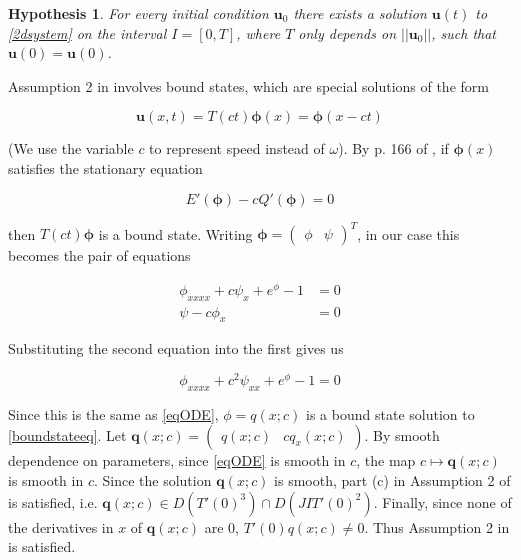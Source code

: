 \documentclass[12pt]{article}
\newtheorem{hypothesis}{Hypothesis}
\begin{document}
\begin{hypothesis}
For every initial condition $\textbf{u}_0$ there exists a solution $\textbf{u}(t)$ to \eqref{2dsystem} on the interval $I = [0, T]$, where $T$ only depends on $||\textbf{u}_0||$, such that $\textbf{u}(0) = \textbf{u}(0)$. 
\end{hypothesis}

Assumption 2 in \cite{Grillakis1987} involves bound states, which are special solutions of the form

\begin{equation}\label{boundstate}
\textbf{u}(x, t) = T(ct)\boldsymbol\phi(x) = \boldsymbol\phi(x - ct)
\end{equation}

(We use the variable $c$ to represent speed instead of $\omega$). By p. 166 of \cite{Grillakis1987}, if $\boldsymbol\phi(x) $ satisfies the stationary equation

\begin{equation}\label{boundstateeq}
E'(\boldsymbol\phi) - c Q'(\boldsymbol\phi) = 0
\end{equation}

then $T(ct)\boldsymbol\phi$ is a bound state. Writing $\boldsymbol\phi = \begin{pmatrix}\phi&\psi\end{pmatrix}^T$, in our case this becomes the pair of equations

\begin{align*}
\phi_{xxxx} + c \psi_x + e^{\phi} - 1 &= 0 \\
\psi - c \phi_x &= 0
\end{align*} 

Substituting the second equation into the first gives us

\begin{equation}
\phi_{xxxx} + c^2 \psi_{xx} + e^{\phi} - 1 = 0
\end{equation}

Since this is the same as \eqref{eqODE}, $\phi = q(x; c)$ is a bound state solution to \eqref{boundstateeq}. Let $\textbf{q}(x; c) =\begin{pmatrix}q(x; c) &c q_x(x; c) \end{pmatrix}$. By smooth dependence on parameters, since \eqref{eqODE} is smooth in $c$, the map $c \mapsto \textbf{q}(x; c)$ is smooth in $c$. Since the solution $\textbf{q}(x; c)$ is smooth, part (c) in Assumption 2 of \cite{Grillakis1987} is satisfied, i.e. $\textbf{q}(x; c) \in D(T'(0)^3) \cap D(J I T'(0)^2)$. Finally, since none of the derivatives in $x$ of $\textbf{q}(x; c)$ are 0, $T'(0)q(x; c) \neq 0$. Thus Assumption 2 in \cite{Grillakis1987} is satisfied.\\
\end{document}
